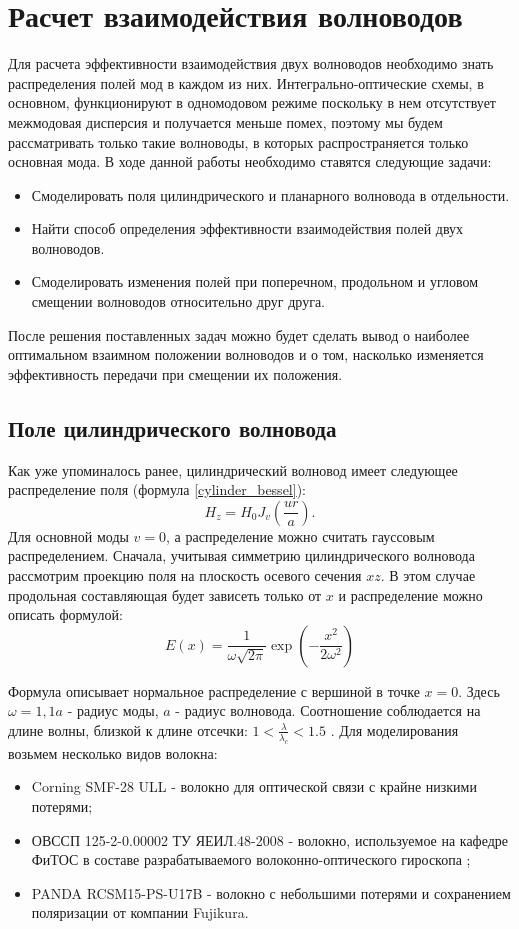 \chapter{Расчет взаимодействия волноводов}
\label{coupling}

Для расчета эффективности взаимодействия двух волноводов необходимо знать распределения полей мод в каждом из них. Интегрально-оптические схемы, в основном, функционируют в одномодовом режиме поскольку в нем отсутствует межмодовая дисперсия и получается меньше помех, поэтому мы будем рассматривать только такие волноводы, в которых распространяется только основная мода. В ходе данной работы необходимо ставятся следующие задачи:
\begin{itemize}
	\item Смоделировать поля цилиндрического и планарного волновода в отдельности.
	\item Найти способ определения эффективности взаимодействия полей двух волноводов.
	\item Смоделировать изменения полей при поперечном, продольном и угловом смещении волноводов относительно друг друга.
\end{itemize} 
После решения поставленных задач можно будет сделать вывод о наиболее оптимальном взаимном положении волноводов и о том, насколько изменяется эффективность передачи при смещении их положения.

\section{Поле цилиндрического волновода}
\label{cylinder_field}
Как уже упоминалось ранее, цилиндрический волновод имеет следующее распределение поля (формула \ref{cylinder_bessel}):
$$
	H_z = H_0 J_v (\frac{ur}{a}).
$$
Для основной моды $v = 0$, а распределение можно считать гауссовым распределением. Сначала, учитывая  симметрию цилиндрического волновода рассмотрим проекцию поля на плоскость осевого сечения $xz$. В этом случае продольная составляющая будет зависеть только от $x$ и распределение можно описать формулой:
\begin{equation}
  \label{gauss}
  E(x)=\frac{1}{\omega\sqrt{2\pi}}\exp\left(-\frac{x^2}{2\omega^2}\right)
\end{equation}

Формула описывает нормальное распределение с вершиной в точке $x=0$.
Здесь $\omega = 1{,}1a$ - радиус моды, $a$ - радиус волновода. Соотношение соблюдается на длине волны, близкой к длине отсечки: $1 < \frac{\lambda}{\lambda_c} < 1.5$ \cite{lefevre}. Для моделирования возьмем несколько видов волокна:
\begin{itemize}
\item Corning SMF-28 ULL - волокно для оптической связи с крайне низкими потерями;
\item ОВССП 125-2-0.00002 ТУ ЯЕИЛ.48-2008 - волокно, используемое на кафедре ФиТОС в составе разрабатываемого волоконно-оптического гироскопа \cite{tu_fog};
\item PANDA RCSM15-PS-U17B - волокно с небольшими потерями и сохранением поляризации от компании Fujikura.
\end{itemize}

